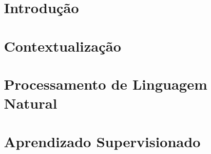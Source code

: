 \documentclass[a4paper,12pt,oneside,openany]{book}
\begin{document}
\frontmatter
\thispagestyle{empty}



\pagebreak



\tableofcontents
\listoffigures
\listoftables
\listofalgorithms

\mainmatter
\cleardoublepage
\chapter{Introdução}
\label{introducao}


\chapter{Contextualização}
\label{contexto}


\chapter{Processamento de Linguagem Natural}
\label{nlp}


\chapter{Aprendizado Supervisionado}
\label{supervisionado}

\end{document}
